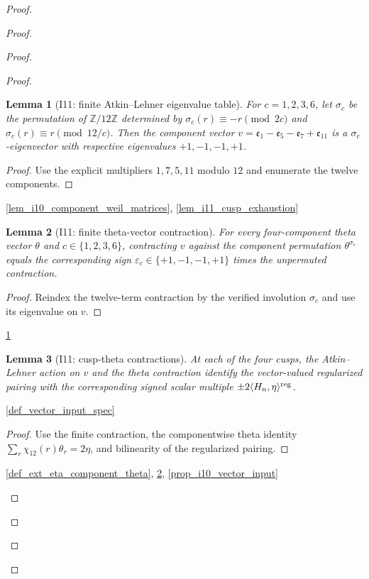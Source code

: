 \documentclass[11pt,a4paper]{article}
\numberwithin{equation}{section}
\theoremstyle{plain}\newtheorem{theorem}{Theorem}[section]\newaliascnt{proposition}{theorem}\newtheorem{proposition}[proposition]{Proposition}\aliascntresetthe{proposition}\newaliascnt{lemma}{theorem}\newtheorem{lemma}[lemma]{Lemma}\aliascntresetthe{lemma}
\theoremstyle{definition}\newaliascnt{definition}{theorem}\newtheorem{definition}[definition]{Definition}\aliascntresetthe{definition}\newaliascnt{notation}{theorem}\newtheorem{notation}[notation]{Notation}\aliascntresetthe{notation}
\providecommand{\lean}[1]{}\providecommand{\leanok}{}
\begin{document}
\begin{proof}
\begin{proof}
\begin{proof}
\begin{proof}
\begin{lemma}[I11: finite Atkin--Lehner eigenvalue table]\label{lem_i11_atkin_lehner_eigenvalues}\lean{SptCM.Analytic.Repaired.fourComponentVector_atkinLehner_eigenvalue}\leanok
For $c=1,2,3,6$, let $\sigma_c$ be the permutation of $\mathbb Z/12\mathbb Z$ determined by
$\sigma_c(r)\equiv-r\pmod{2c}$ and
$\sigma_c(r)\equiv r\pmod{12/c}$.  Then the component vector
$v=\mathfrak e_1-\mathfrak e_5-\mathfrak e_7+\mathfrak e_{11}$ is a
$\sigma_c$-eigenvector with respective eigenvalues $+1,-1,-1,+1$.
\end{lemma}
\begin{proof}Use the explicit multipliers $1,7,5,11$ modulo $12$ and enumerate the twelve components.\end{proof}
\begin{uses-proof}\ref{lem_i10_component_weil_matrices}, \ref{lem_i11_cusp_exhaustion}\end{uses-proof}

\begin{lemma}[I11: finite theta-vector contraction]\label{lem_i11_finite_theta_contraction}\lean{SptCM.Analytic.Repaired.fourComponentThetaContraction_atkinLehner}\leanok
For every four-component theta vector $\theta$ and $c\in\{1,2,3,6\}$,
contracting $v$ against the component permutation $\theta^{\sigma_c}$ equals
the corresponding sign $\varepsilon_c\in\{+1,-1,-1,+1\}$ times the
unpermuted contraction.
\end{lemma}
\begin{proof}Reindex the twelve-term contraction by the verified involution $\sigma_c$ and use its eigenvalue on $v$.\end{proof}
\begin{uses-proof}\ref{lem_i11_atkin_lehner_eigenvalues}\end{uses-proof}

\begin{lemma}[I11: cusp-theta contractions]\label{lem_i11_cusp_contractions}\lean{SptCM.Analytic.Repaired.regularizedCuspThetaContraction_eq_signed_eta}\leanok
At each of the four cusps, the Atkin--Lehner action on $v$ and the theta contraction identify the vector-valued regularized pairing with the corresponding signed scalar multiple $\pm2\langle H_n,\eta\rangle^{\rm reg}$.
\end{lemma}
\begin{uses-statement}\ref{def_vector_input_spec}\end{uses-statement}
\begin{proof}Use the finite contraction, the componentwise theta identity $\sum_r\chi_{12}(r)\theta_r=2\eta$, and bilinearity of the regularized pairing.\end{proof}
\begin{uses-proof}\ref{def_ext_eta_component_theta}, \ref{lem_i11_finite_theta_contraction}, \ref{prop_i10_vector_input}\end{uses-proof}


\end{proof}
\end{proof}
\end{proof}
\end{proof}
\end{document}
